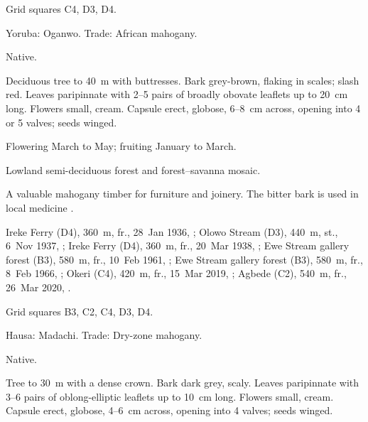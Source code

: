  Grid squares C4, D3, D4.

\begin{center}
\end{center}

\label{sp:MEL02}

 Yoruba: Oganwo. Trade: African
mahogany.

 Native.

 Deciduous tree to 40~m with buttresses. Bark
grey-brown, flaking in scales; slash red. Leaves paripinnate with
2--5 pairs of broadly obovate leaflets up to 20~cm long. Flowers
small, cream. Capsule erect, globose, 6--8~cm across, opening into 4
or 5 valves; seeds winged.

 Flowering March to May; fruiting January to March.

 Lowland semi-deciduous forest and forest--savanna
mosaic.

 A valuable mahogany timber for furniture and joinery. The
bitter bark is used in local medicine \citep{keay1989,louppe2008}.

 Ireke Ferry (D4), 360~m, fr., 28~Jan 1936, ;
Olowo Stream (D3), 440~m, st., 6~Nov 1937, ;
Ireke Ferry (D4), 360~m, fr., 20~Mar 1938, ;
Ewe Stream gallery forest (B3), 580~m, fr., 10~Feb 1961, ;
Ewe Stream gallery forest (B3), 580~m, fr., 8~Feb 1966, ;
Okeri (C4), 420~m, fr., 15~Mar 2019, ;
Agbede (C2), 540~m, fr., 26~Mar 2020, .

 Grid squares B3, C2, C4, D3, D4.

\begin{center}
\end{center}

\label{sp:MEL03}

 

 Hausa: Madachi. Trade: Dry-zone
mahogany.

 Native.

 Tree to 30~m with a dense crown. Bark dark grey,
scaly. Leaves paripinnate with 3--6 pairs of oblong-elliptic leaflets
up to 10~cm long. Flowers small, cream. Capsule erect, globose,
4--6~cm across, opening into 4 valves; seeds winged.

